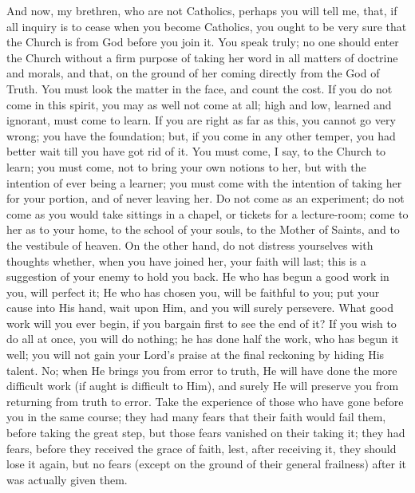 And now, my brethren, who are not Catholics, perhaps you will tell
me, that, if all inquiry is to cease when you become Catholics, you
ought to be very sure that the Church is from God before you join it.
You speak truly; no one should enter the Church without a firm purpose
of taking her word in all matters of doctrine and morals, and that, on
the ground of her coming directly from the God of Truth. You must look
the matter in the face, and count the cost. If you do not come in this
spirit, you may as well not come at all; high and low, learned and
ignorant, must come to learn. If you are right as far as this, you
cannot go very wrong; you have the foundation; but, if you come in any
other temper, you had better wait till you have got rid of it. You
must come, I say, to the Church to learn; you must come, not to bring
your own notions to her, but with the intention of ever being a
learner; you must come with the intention of taking her for your
portion, and of never leaving her. Do not come as an experiment; do
not come as you would take sittings in a chapel, or tickets for a
lecture-room; come to her as to your home, to the school of your
souls, to the Mother of Saints, and to the vestibule of heaven. On the
other hand, do not distress yourselves with thoughts whether, when you
have joined her, your faith will last; this is a suggestion of your
enemy to hold you back. He who has begun a good work in you, will
perfect it; He who has chosen you, will be faithful to you; put your
cause into His hand, wait upon Him, and you will surely persevere.
What good work will you ever begin, if you bargain first to see the
end of it? If you wish to do all at once, you will do nothing; he has
done half the work, who has begun it well; you will not gain your
Lord's praise at the final reckoning by hiding His talent. No; when He
brings you from error to truth, He will have done the more difficult
work (if aught is difficult to Him), and surely He will preserve you
from returning from truth to error. Take the experience of those who
have gone before you in the same course; they had many fears that
their faith would fail them, before taking the great step, but those
fears vanished on their taking it; they had fears, before they
received the grace of faith, lest, after receiving it, they should
lose it again, but no fears (except on the ground of their general
frailness) after it was actually given them.

